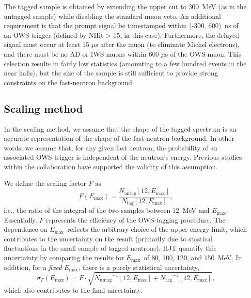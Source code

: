 \documentclass[../thesis.tex]{subfiles}
\begin{document}
The tagged sample is obtained by extending the upper cut to 300~MeV (as in the
untagged sample) while disabling the standard muon veto. An additional
requirement is that the prompt signal be timestamped within (-300, 600)~ns of an
OWS trigger (defined by NHit > 15, in this case). Furthermore, the delayed
signal must occur at least 15 $\mu$s after the muon (to eliminate Michel
electrons), and there must be no AD or IWS muons within 600 $\mu$s of the OWS
muon. This selection results in fairly low statistics (amounting to a few
hundred events in the near halls), but the size of the sample is still
sufficient to provide strong constraints on the fast-neutron background.

\subsection{Scaling method}
\label{sec:fastn_scaling}

In the scaling method, we assume that the shape of the tagged spectrum is an
accurate representation of the shape of the fast-neutron background. In other
words, we assume that, for any given fast neutron, the probability of an
associated OWS trigger is independent of the neutron's energy. Previous studies
within the collaboration have supported the validity of this assumption.

\def\emax{\ensuremath{E_\mathrm{max}}} \def\ntag{\ensuremath{N_\mathrm{tag}}}
\def\nuntag{\ensuremath{N_\mathrm{untag}}}

We define the scaling factor $F$ as \[ F(\emax) = \frac{\nuntag[12,
    \emax]}{\ntag[12, \emax]}, \] i.e., the ratio of the integral of the two
samples between 12~MeV and \emax. Essentially, $F$ represents the efficiency of
the OWS-tagging procedure. The dependence on \emax\ reflects the arbitrary
choice of the upper energy limit, which contributes to the uncertainty on the
result (primarily due to stastical fluctuations in the small sample of tagged
neutrons). HJT quantify this uncertainty by comparing the results for \emax\ of
80, 100, 120, and 150~MeV. In addition, for a \emph{fixed} \emax, there is a
purely statistical uncertainty,
\[ \sigma_F(\emax) = F \cdot \sqrt{\nuntag^{-1}[12, \emax] + \ntag^{-1}[12,
    \emax]},
\]
which also contributes to the final uncertainty.

\def\nfn{\ensuremath{N_\mathrm{fid}}} \def\rfn{\ensuremath{R_\mathrm{FN}}}
\end{document}
